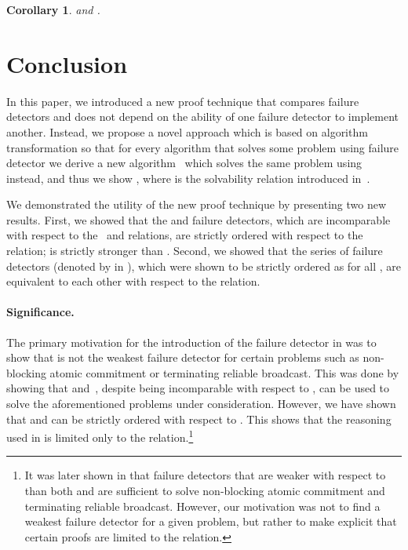 \documentclass[11pt]{article}
\newtheorem{corollary}[proposition]{Corollary}
\begin{document}
\begin{corollary}
 and .
\end{corollary}


\section{Conclusion}

In this paper, we introduced a new proof technique that compares
     failure detectors and does not depend on the ability of one
     failure detector to implement another.
Instead, we propose a novel approach which is based on algorithm
     transformation  so that for every algorithm  that solves
     some problem using failure detector  we derive a new
     algorithm~ which solves the same problem using 
     instead, and thus we show , where  is
     the solvability relation introduced
     in~\cite{charron-bost:10:isolt}.

We demonstrated the utility of the new proof technique by presenting
     two new results.
First, we showed that the  and  failure detectors, which
     are incomparable with respect to the~ and  relations,
     are strictly ordered with respect to the  relation;
      is strictly stronger than .
Second, we showed that the  series of failure detectors
     (denoted by  in \cite{bhatt:oteow}), which were shown to be
     strictly ordered as  for all , are
     equivalent to each other with respect to the  relation.

\paragraph{Significance.}

The primary motivation for the introduction of the  failure
     detector in \cite{guer:01:hfap} was to show that  is not
     the weakest failure detector for certain problems such as
     non-blocking atomic commitment or terminating reliable broadcast.
This was done by showing that  and~, despite being
     incomparable with respect to , can be used to solve the
     aforementioned problems under consideration.
However, we have shown that  and  can be strictly ordered
     with respect to .
This shows that the reasoning used in \cite{guer:01:hfap} is limited
     only to the   relation.\footnote{It was later shown in
     \cite{larrea:otwfd} that failure detectors that are weaker with
     respect to  than both  and  are sufficient to
     solve non-blocking atomic commitment and terminating reliable
     broadcast.
However, our motivation was not to find a weakest failure detector for
     a given problem, but rather to make explicit that certain proofs
     are limited to the  relation.} 
\end{document}
